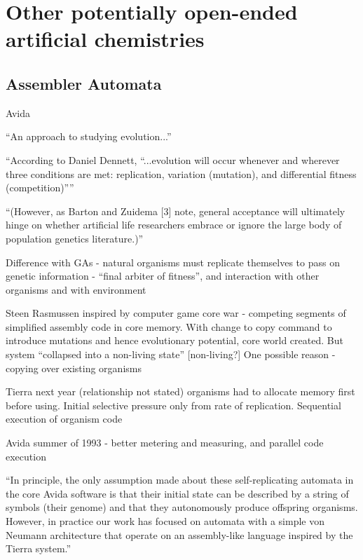 \section{Other potentially open-ended artificial chemistries}
\subsection{Assembler Automata}

Avida \parencite{Ofria2004}

``An approach to studying evolution...''

``According to Daniel Dennett, ``...evolution will occur whenever and wherever three conditions are met: replication, variation (mutation), and differential fitness (competition)''''

``(However, as Barton and Zuidema {[}3{]} note, general acceptance will ultimately hinge on whether artificial life researchers embrace or ignore the large body of population genetics literature.)''

Difference with GAs - natural organisms must replicate themselves to pass on genetic information - ``final arbiter of fitness'', and interaction with other organisms and with environment \parencite{Ofria2004}

Steen Rasmussen inspired by computer game core war - competing segments of simplified assembly code in core memory. With change to copy command to introduce mutations and hence evolutionary potential,
core world created. But system ``collapsed into a non-living state'' {[}non-living?{]} One possible reason - copying over existing organisms

Tierra next year (relationship not stated) organisms had to allocate memory first before using. Initial selective pressure only from rate of replication. Sequential execution of organism code

Avida summer of 1993 - better metering and measuring, and parallel code execution

``In principle, the only assumption made about these self-replicating automata in the core Avida software is that their initial state can be described by a string of symbols (their genome) and that they autonomously produce offspring organisms. However, in practice our work has focused on automata with a simple von Neumann architecture that operate on an assembly-like language inspired by
the Tierra system.''


